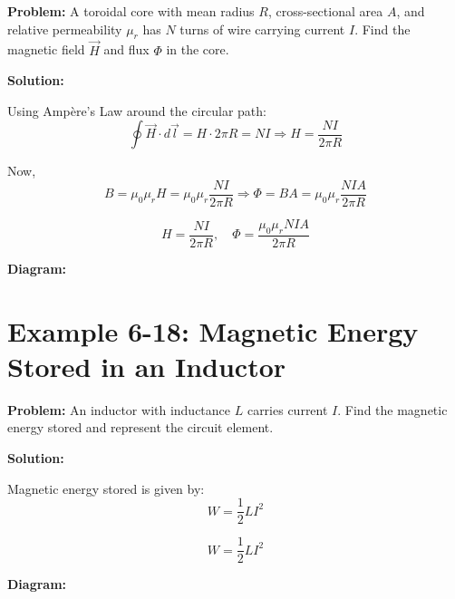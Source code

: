 \documentclass[12pt]{article}
\begin{document}
\textbf{Problem:}  
A toroidal core with mean radius \( R \), cross-sectional area \( A \), and relative permeability \( \mu_r \) has \( N \) turns of wire carrying current \( I \). Find the magnetic field \( \vec{H} \) and flux \( \Phi \) in the core.

\textbf{Solution:}

Using Ampère’s Law around the circular path:
\[
\oint \vec{H} \cdot d\vec{l} = H \cdot 2\pi R = N I
\Rightarrow H = \frac{N I}{2\pi R}
\]

Now,
\[
B = \mu_0 \mu_r H = \mu_0 \mu_r \frac{N I}{2\pi R}
\Rightarrow \Phi = B A = \mu_0 \mu_r \frac{N I A}{2\pi R}
\]

\begin{tcolorbox}
\[
\boxed{H = \frac{N I}{2\pi R}}, \quad
\boxed{\Phi = \frac{\mu_0 \mu_r N I A}{2\pi R}}
\]
\end{tcolorbox}

\textbf{Diagram:}
\begin{center}
\end{center}



\section*{Example 6-18: Magnetic Energy Stored in an Inductor}

\textbf{Problem:}  
An inductor with inductance \( L \) carries current \( I \). Find the magnetic energy stored and represent the circuit element.

\textbf{Solution:}

Magnetic energy stored is given by:
\[
W = \frac{1}{2} L I^2
\]

\begin{tcolorbox}
\[
\boxed{W = \frac{1}{2} L I^2}
\]
\end{tcolorbox}

\textbf{Diagram:}
\begin{center}
\end{center}
\end{document}

